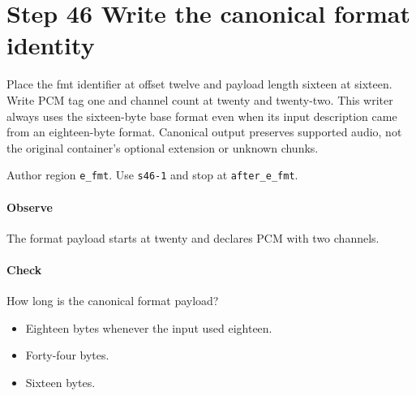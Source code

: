 \section{Step 46 Write the canonical format identity}\label{pcm-wav-s46}
Place the fmt identifier at offset twelve and payload length sixteen at sixteen. Write PCM tag one and channel count at twenty and twenty-two. This writer always uses the sixteen-byte base format even when its input description came from an eighteen-byte format. Canonical output preserves supported audio, not the original container's optional extension or unknown chunks.

Author region \texttt{e\_fmt}. Use \texttt{s46-1} and stop at \texttt{after\_e\_fmt}.

\paragraph{Observe} The format payload starts at twenty and declares PCM with two channels.

\paragraph{Check} How long is the canonical format payload?
\begin{itemize}
  \item[A.] Eighteen bytes whenever the input used eighteen.
  \item[B.] Forty-four bytes.
  \item[C.] Sixteen bytes.
\end{itemize}
